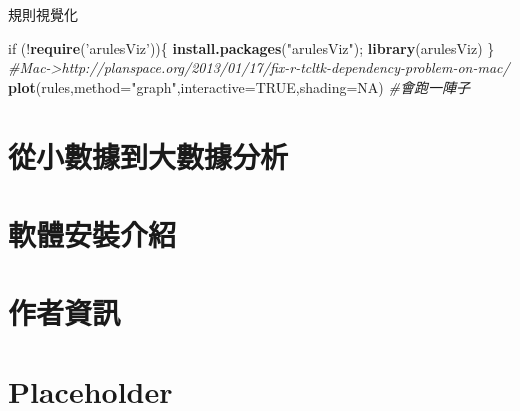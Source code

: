 \documentclass[]{book}
\newenvironment{Shaded}{\begin{snugshade}}{\end{snugshade}}
\newcommand{\KeywordTok}[1]{\textcolor[rgb]{0.13,0.29,0.53}{\textbf{{#1}}}}
\newcommand{\DataTypeTok}[1]{\textcolor[rgb]{0.13,0.29,0.53}{{#1}}}
\newcommand{\StringTok}[1]{\textcolor[rgb]{0.31,0.60,0.02}{{#1}}}
\newcommand{\CommentTok}[1]{\textcolor[rgb]{0.56,0.35,0.01}{\textit{{#1}}}}
\newcommand{\OtherTok}[1]{\textcolor[rgb]{0.56,0.35,0.01}{{#1}}}
\newcommand{\NormalTok}[1]{{#1}}
\begin{document}
規則視覺化

\begin{Shaded}
\begin{Highlighting}[]
\NormalTok{if (!}\KeywordTok{require}\NormalTok{(}\StringTok{'arulesViz'}\NormalTok{))\{}
    \KeywordTok{install.packages}\NormalTok{(}\StringTok{"arulesViz"}\NormalTok{); }\KeywordTok{library}\NormalTok{(arulesViz)}
\NormalTok{\}}
\CommentTok{#Mac->http://planspace.org/2013/01/17/fix-r-tcltk-dependency-problem-on-mac/}
\KeywordTok{plot}\NormalTok{(rules,}\DataTypeTok{method=}\StringTok{"graph"}\NormalTok{,}\DataTypeTok{interactive=}\OtherTok{TRUE}\NormalTok{,}\DataTypeTok{shading=}\OtherTok{NA}\NormalTok{) }\CommentTok{#會跑一陣子}
\end{Highlighting}
\end{Shaded}

\chapter{從小數據到大數據分析}\label{big}

\chapter{軟體安裝介紹}\label{install}

\chapter*{作者資訊}\label{author}

\chapter{Placeholder}\label{placeholder}


\end{document}
